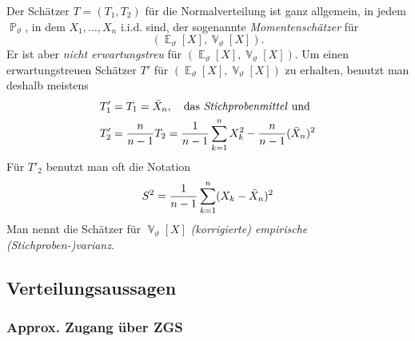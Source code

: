 \documentclass[a4paper,10pt]{article}
\renewcommand{\P}{\operatorname{\mathbb{P}}}
\DeclareMathOperator{\E}{\mathbb{E}}
\DeclareMathOperator{\V}{\mathbb{V}}
\DeclareMathOperator{\normal}{\mathcal{N}}
\numberwithin{equation}{section}
\begin{document}

Der Schätzer \( T = (T_1, T_2) \) für die Normalverteilung ist ganz allgemein, in jedem \( \P_\vartheta \), in dem \( X_1, \dots, X_n \) i.i.d. sind, der sogenannte \emph{Momentenschätzer} für
\[
    (\E_\vartheta[X], \V_\vartheta[X]) \text{.}
\]
Er ist aber \emph{nicht erwartungstreu} für \( (\E_\vartheta[X], \V_\vartheta[X]) \).
Um einen erwartungstreuen Schätzer \( T' \) für \( (\E_\vartheta[X], \V_\vartheta[X]) \) zu erhalten, benutzt man deshalb meistens
\begin{align*}
    T'_1 &= T_1 = \Bar{X}_n, \quad \text{das \emph{Stichprobenmittel} und} \\
    T'_2 &= \frac{n}{n - 1} T_2 = \frac{1}{n - 1} \sum_{k = 1}^n X_k^2 - \frac{n}{n - 1} (\Bar{X}_n)^2
\end{align*}
Für \( T'_2 \) benutzt man oft die Notation
\[
    S^2 = \frac{1}{n - 1} \sum_{k = 1}^n (X_k - \Bar{X}_n)^2
\]
Man nennt die Schätzer für \( \V_\vartheta[X] \) \emph{(korrigierte) empirische (Stichproben-)varianz}.

\subsection{Verteilungsaussagen}

\subsubsection{Approx. Zugang über ZGS}
\end{document}
